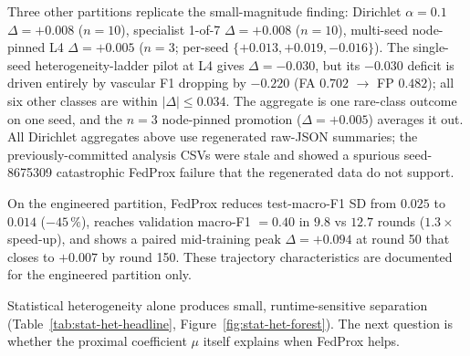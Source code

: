 \documentclass[11pt,a4paper]{report}
\begin{document}
Three other partitions replicate the small-magnitude finding: Dirichlet
$\alpha = 0.1$ $\Delta = +0.008$ ($n=10$), specialist 1-of-7 $\Delta = +0.008$
($n=10$), multi-seed node-pinned L4 $\Delta = +0.005$ ($n=3$; per-seed
$\{+0.013, +0.019, -0.016\}$). The single-seed heterogeneity-ladder pilot
at L4 gives $\Delta = -0.030$, but its $-0.030$ deficit is driven entirely
by vascular F1 dropping by $-0.220$ (FA $0.702$ $\rightarrow$ FP $0.482$);
all six other classes are within $|\Delta| \leq 0.034$. The aggregate is one
rare-class outcome on one seed, and the $n=3$ node-pinned promotion
($\Delta = +0.005$) averages it out. All Dirichlet aggregates above use
regenerated raw-JSON summaries; the previously-committed analysis CSVs were
stale and showed a spurious seed-8675309 catastrophic FedProx failure that
the regenerated data do not support.

On the engineered partition, FedProx reduces test-macro-F1 SD from $0.025$
to $0.014$ ($-45\,\%$), reaches validation macro-F1 $= 0.40$ in $9.8$ vs
$12.7$ rounds ($1.3\times$ speed-up), and shows a paired mid-training peak
$\Delta = +0.094$ at round 50 that closes to $+0.007$ by round 150. These
trajectory characteristics are documented for the engineered partition only.

Statistical heterogeneity alone produces small, runtime-sensitive separation
(Table~\ref{tab:stat-het-headline}, Figure~\ref{fig:stat-het-forest}). The
next question is whether the proximal coefficient $\mu$ itself explains when
FedProx helps.


\end{document}
